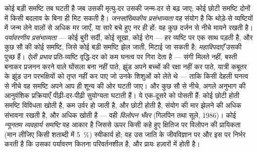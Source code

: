 \begin{definition}[छोटेपन के जोखिम]\label{def:b3:conservation-biology:small}
कोई बड़ी समष्टि तब घटती है जब उसकी मृत्यु-दर उसकी जन्म-दर से बढ़ जाए;
कोई छोटी समष्टि दोनों में किसी बदलाव के बिना ही मिट सकती है।
\emph{जनसांख्यिकीय प्रसंभाव्यता} वह संयोग है कि थोड़े-से व्यष्टियों में
जन्म लेने वालों से अधिक मर जाएँ, या सारे बचे हुए नर ही हों: वह कुछ दर्जन
से नीचे मायने रखती है। \emph{पर्यावरणीय प्रसंभाव्यता} --- कोई बुरी
सर्दी, कोई सूखा, कोई रोग --- हर व्यष्टि पर एक साथ पड़ती है, और कुछ सौ की
कोई समष्टि, जिसे कोई बड़ी समष्टि झेल जाती, मिटाई जा सकती है;
\emph{महाविपदाएँ} उसकी पुच्छ हैं। \emph{ऐली प्रभाव} प्रति-व्यष्टि
वृद्धि-दर को कम घनत्व पर गिरा देता है --- संगी मिलते नहीं, बस्ती बनाकर
प्रजनन करने वाले घोंसला बना नहीं पाते, झुंड अपने बच्चों की रक्षा नहीं कर
पाते, यात्री कबूतर के झुंड उन परभक्षियों को तृप्त नहीं कर पाए जो उनके
शिशुओं को लेते थे --- ताकि किसी देहली घनत्व से नीचे वह समष्टि अपने आप ही
शून्य की ओर घटती जाए। और कुछ सौ से नीचे, अगले अनुभाग की आनुवंशिक
प्रक्रियाएँ पीढ़ी-दर-पीढ़ी सुयोग्यता घटाती हैं। ये एक-दूसरे को पोसती हैं:
कोई छोटी होती समष्टि विविधता खोती है, कम उर्वर हो जाती है, और छोटी होती
है, संयोग की मार झेलने की अधिक संभावना रखती है, और अधिक खोती है --- वही
\emph{विलोपन भँवर} (गिलपिन तथा सूले, 1986)। कोई \emph{न्यूनतम व्यवहार्य
समष्टि} वह आकार है जिससे ऊपर किसी कहे हुए क्षितिज पर विलोपन की प्रायिकता
(मान लीजिए किसी शताब्दी में \qty{5}{\%}) स्वीकार्य हो; वह उस जाति के
जीवविज्ञान पर और इस पर निर्भर करती है कि उसका पर्यावरण कितना परिवर्तनशील
है, और प्रायः हज़ारों में होती है।
\end{definition}

